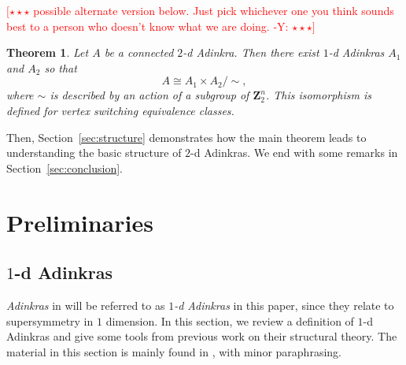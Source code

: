 \documentclass[12pt,twoside,singlespace]{article}
\numberwithin{equation}{section}
\newtheorem{thm}[equation]{Theorem}
\theoremstyle{definition}
\newcommand{\ZZ}{\mathbf{Z}}
\newcommand{\com}[1]{\textcolor{red}{$[\star \star \star$ #1 $\star \star \star]$}}
\begin{document}
\com{possible alternate version below. Just pick whichever one you think sounds best to a person who doesn't know what we are doing. -Y:}
\begin{thm}
\label{thm:main}
Let $A$ be a connected $2$-d Adinkra.  Then there exist $1$-d Adinkras $A_1$ and $A_2$ so that
\[A\cong A_1\times A_2/\sim, \]
where $\sim$ is described by an action of a subgroup of $\ZZ_2^n$. This isomorphism is defined for vertex switching equivalence classes.
\end{thm}

Then, Section~\ref{sec:structure} demonstrates how the main theorem leads to understanding the basic structure of $2$-d Adinkras. We end with some remarks in Section~\ref{sec:conclusion}.

\section{Preliminaries}
\label{sec:prelim}

\subsection{$1$-d Adinkras}
\label{sec:1d}
\emph{Adinkras} in \cite{d2l:first,d2l:graph-theoretic,zhang:adinkras} will be referred to as \emph{$1$-d Adinkras} in this paper, since they relate to supersymmetry in $1$ dimension. In this section, we  review a definition of $1$-d Adinkras and give some tools from previous work on their structural theory. The material in this section is mainly found in \cite{d2l:omni,zhang:adinkras}, with minor paraphrasing. 
\end{document}
